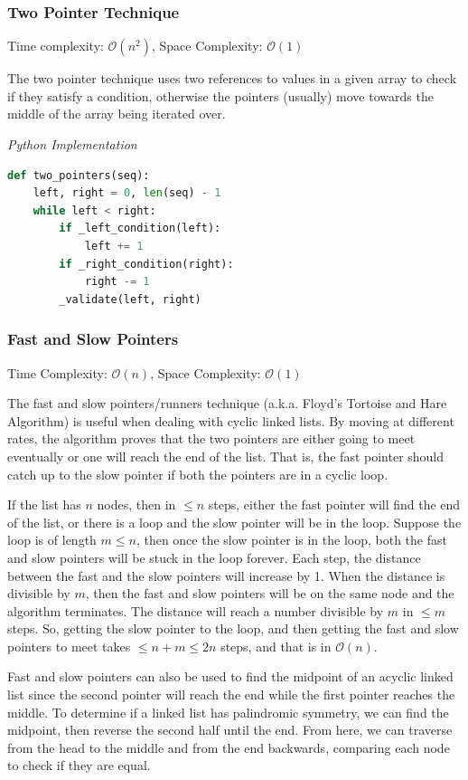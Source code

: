 \documentclass{article}
\newcommand{\bigO}{\mathcal{O}}
\begin{document}
    \subsubsection{Two Pointer Technique}
    Time complexity: $\bigO(n^2)$, Space Complexity: $\bigO(1)$
    
    The two pointer technique uses two references to values in a given array to check if they satisfy a condition, otherwise the pointers (usually) move towards the middle of the array being iterated over.
    
\vspace{8pt} \emph{Python Implementation}
\begin{lstlisting}[language=Python]
def two_pointers(seq):
    left, right = 0, len(seq) - 1
    while left < right:
        if _left_condition(left):
            left += 1
        if _right_condition(right):
            right -= 1
        _validate(left, right)
\end{lstlisting}
    
    \subsubsection{Fast and Slow Pointers}
    Time Complexity: $\bigO(n)$, Space Complexity: $\bigO(1)$
    
    The fast and slow pointers/runners technique (a.k.a. Floyd’s Tortoise and Hare Algorithm) is useful when dealing with cyclic linked lists. By moving at different rates, the algorithm proves that the two pointers are either going to meet eventually or one will reach the end of the list. That is, the fast pointer should catch up to the slow pointer if both the pointers are in a cyclic loop. 
    
    If the list has $n$ nodes, then in $\leq n$ steps, either the fast pointer will find the end of the list, or there is a loop and the slow pointer will be in the loop. Suppose the loop is of length $m \leq n$, then once the slow pointer is in the loop, both the fast and slow pointers will be stuck in the loop forever. Each step, the distance between the fast and the slow pointers will increase by 1. When the distance is divisible by $m$, then the fast and slow pointers will be on the same node and the algorithm terminates. The distance will reach a number divisible by $m$ in $\leq m$ steps. So, getting the slow pointer to the loop, and then getting the fast and slow pointers to meet takes $\leq n + m \leq 2n$ steps, and that is in $\bigO(n)$.

    Fast and slow pointers can also be used to find the midpoint of an acyclic linked list since the second pointer will reach the end while the first pointer reaches the middle. To determine if a linked list has palindromic symmetry, we can find the midpoint, then reverse the second half until the end. From here, we can traverse from the head to the middle and from the end backwards, comparing each node to check if they are equal.
    
\end{document}
